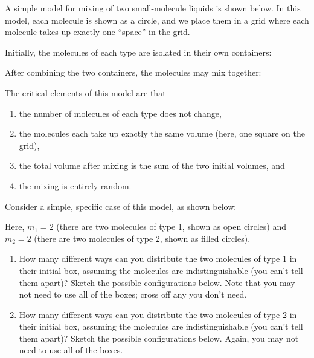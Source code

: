 \begin{activity}
\begin{instructornotes}
\end{instructornotes}


\begin{model}

A simple model for mixing of two small-molecule liquids is shown below.  In this model, each molecule is shown as a circle, and we place them in a grid where each molecule takes up exactly one ``space'' in the grid.

Initially, the molecules of each type are isolated in their own containers:

After combining the two containers, the molecules may mix together:

The critical elements of this model are that
\begin{enumerate}[itemsep=0pt,topsep=-6pt]
	\item the number of molecules of each type does not change,
	\item the molecules each take up exactly the same volume (here, one square on the grid),
	\item the total volume after mixing is the sum of the two initial volumes, and
	\item the mixing is entirely random.
\end{enumerate}

\end{model}

\vspace{0.05in}
\begin{ctqs}

	\question Consider a simple, specific case of this model, as shown below:

		Here, $m_1=2$ (there are two molecules of type 1, shown as open circles) and $m_2=2$ (there are two molecules of type 2, shown as filled circles).
	
		\begin{enumerate}
			\item How many different ways can you distribute the two molecules of type 1 in their initial box, assuming the molecules are indistinguishable (you can't tell them apart)?  Sketch the possible configurations below.  Note that you may not need to use all of the boxes; cross off any you don't need.
		
			\item How many different ways can you distribute the two molecules of type 2 in their initial box, assuming the molecules are indistinguishable (you can't tell them apart)?  Sketch the possible configurations below. Again, you may not need to use all of the boxes.
			

\end{enumerate}
\end{ctqs}
\end{activity}
